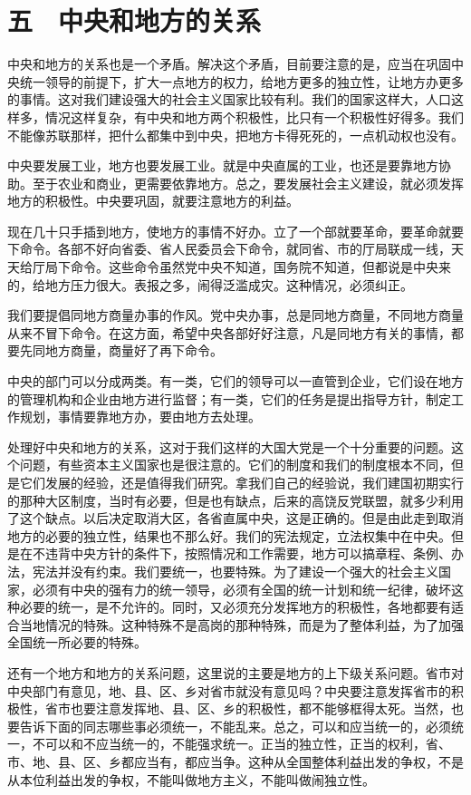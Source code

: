 \section{五　中央和地方的关系}

中央和地方的关系也是一个矛盾。解决这个矛盾，目前要注意的是，应当在巩固中央统一领导的前提下，扩大一点地方的权力，给地方更多的独立性，让地方办更多的事情。这对我们建设强大的社会主义国家比较有利。我们的国家这样大，人口这样多，情况这样复杂，有中央和地方两个积极性，比只有一个积极性好得多。我们不能像苏联那样，把什么都集中到中央，把地方卡得死死的，一点机动权也没有。

中央要发展工业，地方也要发展工业。就是中央直属的工业，也还是要靠地方协助。至于农业和商业，更需要依靠地方。总之，要发展社会主义建设，就必须发挥地方的积极性。中央要巩固，就要注意地方的利益。

现在几十只手插到地方，使地方的事情不好办。立了一个部就要革命，要革命就要下命令。各部不好向省委、省人民委员会下命令，就同省、市的厅局联成一线，天天给厅局下命令。这些命令虽然党中央不知道，国务院不知道，但都说是中央来的，给地方压力很大。表报之多，闹得泛滥成灾。这种情况，必须纠正。

我们要提倡同地方商量办事的作风。党中央办事，总是同地方商量，不同地方商量从来不冒下命令。在这方面，希望中央各部好好注意，凡是同地方有关的事情，都要先同地方商量，商量好了再下命令。

中央的部门可以分成两类。有一类，它们的领导可以一直管到企业，它们设在地方的管理机构和企业由地方进行监督；有一类，它们的任务是提出指导方针，制定工作规划，事情要靠地方办，要由地方去处理。

处理好中央和地方的关系，这对于我们这样的大国大党是一个十分重要的问题。这个问题，有些资本主义国家也是很注意的。它们的制度和我们的制度根本不同，但是它们发展的经验，还是值得我们研究。拿我们自己的经验说，我们建国初期实行的那种大区制度，当时有必要，但是也有缺点，后来的高饶反党联盟，就多少利用了这个缺点。以后决定取消大区，各省直属中央，这是正确的。但是由此走到取消地方的必要的独立性，结果也不那么好。我们的宪法规定，立法权集中在中央。但是在不违背中央方针的条件下，按照情况和工作需要，地方可以搞章程、条例、办法，宪法并没有约束。我们要统一，也要特殊。为了建设一个强大的社会主义国家，必须有中央的强有力的统一领导，必须有全国的统一计划和统一纪律，破坏这种必要的统一，是不允许的。同时，又必须充分发挥地方的积极性，各地都要有适合当地情况的特殊。这种特殊不是高岗的那种特殊，而是为了整体利益，为了加强全国统一所必要的特殊。

还有一个地方和地方的关系问题，这里说的主要是地方的上下级关系问题。省市对中央部门有意见，地、县、区、乡对省市就没有意见吗？中央要注意发挥省市的积极性，省市也要注意发挥地、县、区、乡的积极性，都不能够框得太死。当然，也要告诉下面的同志哪些事必须统一，不能乱来。总之，可以和应当统一的，必须统一，不可以和不应当统一的，不能强求统一。正当的独立性，正当的权利，省、市、地、县、区、乡都应当有，都应当争。这种从全国整体利益出发的争权，不是从本位利益出发的争权，不能叫做地方主义，不能叫做闹独立性。

